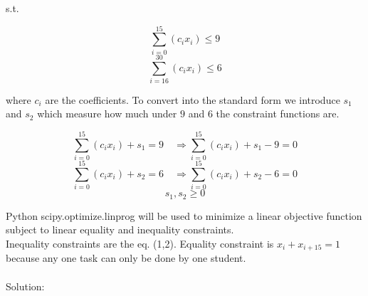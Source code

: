 \documentclass[12pt]{article}         %
\begin{document}
s.t.

\begin{equation}
 \sum_{i=0}^{15} ( c_i x_i) \le 9 
\end{equation}
\begin{equation}
\sum_{i=16}^{30} ( c_i x_i) \le 6 
\end{equation}

where $c_i$ are the coefficients. To convert into the standard form we introduce $s_1$ and $s_2$ which measure how much under $9$ and $6$ the constraint functions are.

$$
 \sum_{i=0}^{15} ( c_i x_i) + s_1 = 9 \quad\Rightarrow
 \sum_{i=0}^{15} ( c_i x_i) + s_1 - 9 = 0
$$
$$
 \sum_{i=0}^{15} ( c_i x_i) + s_2 = 6\quad\Rightarrow
 \sum_{i=0}^{15} ( c_i x_i) + s_2 - 6 = 0
$$
$$
s_1, s_2 \ge 0
$$

Python scipy.optimize.linprog %
will be used to minimize a linear objective function subject to linear equality and inequality constraints. \\
Inequality constraints are the eq. (1,2). Equality constraint is $x_i + x_{i+15} = 1$ because any one task can only be done by one student.
\\ \\
Solution:
\end{document}
